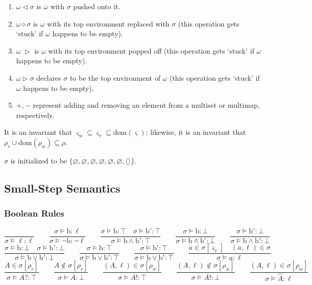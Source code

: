 \documentclass[times,10pt]{article}
\begin{document}
\begin{enumerate}
    \item $\omega \triangleleft \sigma$ is $\omega$ with $\sigma$ pushed onto it.
    \item $\omega \diamond \sigma$ is $\omega$ with its top environment replaced with $\sigma$ (this operation gets `stuck' if $\omega$ happens to be empty).
    \item $\omega \; \triangleright$ is $\omega$ with its top environment popped off (this operation gets `stuck' if $\omega$ happens to be empty).
    \item $\omega \triangleright \sigma$ declares $\sigma$ to be the top environment of $\omega$ (this operation gets `stuck' if $\omega$ happens to be empty).
    \item $+, -$ represent adding and removing an element from a multiset or multimap, respectively.
\end{enumerate}

It is an invariant that $\varsigma_w \subseteq \varsigma_r \subseteq \mathrm{dom}(\varsigma)$; likewise, it is an invariant that $\rho_r \cup \mathrm{dom}(\rho_w) \subseteq \rho$.

$\sigma$ is initialized to be $\{\varnothing, \varnothing, \varnothing, \varnothing, \varnothing, \varnothing, \langle \rangle\}$.

\subsection{Small-Step Semantics}
\subsubsection{Boolean Rules}
$$
    \frac{}{\sigma \models \ell : \ell} \qquad
    \frac{\sigma \models \mathrm{b} : \ell}{\sigma \models \neg \mathrm{b} : \neg \ell} \qquad
    \frac{\sigma \models \mathrm{b} : \top \quad \sigma \models \mathrm{b}' : \top}{\sigma \models \mathrm{b} \wedge \mathrm{b}' : \top} \qquad
    \frac{\sigma \models \mathrm{b} : \bot}{\sigma \models \mathrm{b} \wedge \mathrm{b}' : \bot} \qquad
    \frac{\sigma \models \mathrm{b}' : \bot}{\sigma \models \mathrm{b} \wedge \mathrm{b}' : \bot} $$$$
    \frac{\sigma \models \mathrm{b} : \bot \quad \sigma \models \mathrm{b}' : \bot}{\sigma \models \mathrm{b} \vee \mathrm{b}' : \bot} \qquad
    \frac{\sigma \models \mathrm{b} : \top}{\sigma \models \mathrm{b} \vee \mathrm{b}' : \top} \qquad
    \frac{\sigma \models \mathrm{b}' : \top}{\sigma \models \mathrm{b} \vee \mathrm{b}' : \top} \qquad
    \frac{a \in \sigma[\varsigma_r] \quad (a, \ell) \in \sigma}{\sigma \models a : \ell} $$$$
    \frac{A \in \sigma[\rho_r]}{\sigma \models \overline{A?} : \top} \qquad
    \frac{A \notin \sigma[\rho_r]}{\sigma \models \overline{A} : \bot} \qquad
    \frac{(A, \ell) \in \sigma[\rho_w]}{\sigma \models \overline{A!} : \top} \qquad
    \frac{(A, \ell) \notin \sigma[\rho_w]}{\sigma \models \overline{A!} : \bot} \qquad
    \frac{(A, \ell) \in \sigma[\rho_w]}{\sigma \models \widehat{A} : \ell}
$$
\end{document}
